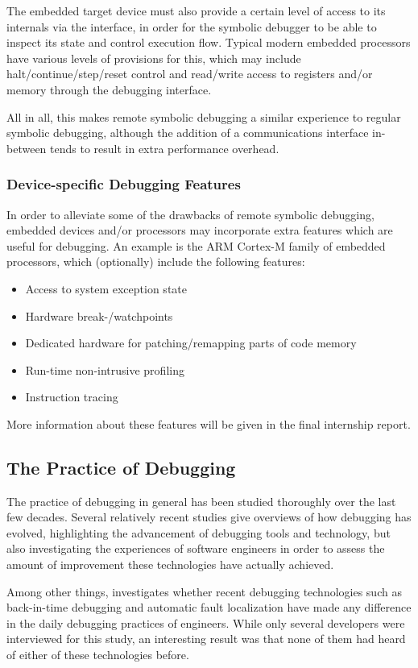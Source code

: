 The embedded target device must also provide a certain level of access to its internals via the interface, in order for the symbolic debugger to be able to inspect its state and control execution flow. Typical modern embedded processors have various levels of provisions for this, which may include halt/continue/step/reset control and read/write access to registers and/or memory through the debugging interface.

All in all, this makes remote symbolic debugging a similar experience to regular symbolic debugging, although the addition of a communications interface in-between tends to result in extra performance overhead.

\subsubsection{Device-specific Debugging Features}

In order to alleviate some of the drawbacks of remote symbolic debugging, embedded devices and/or processors may incorporate extra features which are useful for debugging. An example is the ARM Cortex-M family of embedded processors, which (optionally) include the following features:

\begin{itemize}
\item Access to system exception state
\item Hardware break-/watchpoints
\item Dedicated hardware for patching/remapping parts of code memory
\item Run-time non-intrusive profiling
\item Instruction tracing
\end{itemize}

More information about these features will be given in the final internship report.

\subsection{The Practice of Debugging}
\label{debuggingpractice}

The practice of debugging in general has been studied thoroughly over the last few decades. Several relatively recent studies  give overviews of how debugging has evolved, highlighting the advancement of debugging tools and technology, but also investigating the experiences of software engineers in order to assess the amount of improvement these technologies have actually achieved.

Among other things, \cite{debugging_practice} investigates whether recent debugging technologies such as back-in-time debugging and automatic fault localization have made any difference in the daily debugging practices of engineers. While only several developers were interviewed for this study, an interesting result was that none of them had heard of either of these technologies before.
